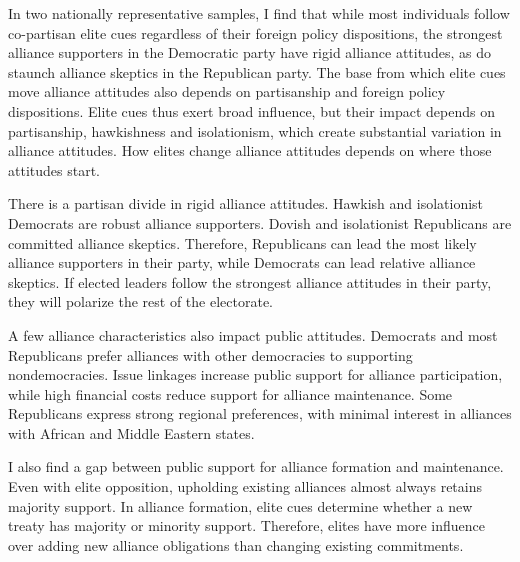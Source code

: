 \documentclass[12pt]{article}
\begin{document}
In two nationally representative samples, I find that while most individuals follow co-partisan elite cues regardless of their foreign policy dispositions, the strongest alliance supporters in the Democratic party have rigid alliance attitudes, as do staunch alliance skeptics in the Republican party. 
The base from which elite cues move alliance attitudes also depends on partisanship and foreign policy dispositions.
Elite cues thus exert broad influence, but their impact depends on partisanship, hawkishness and isolationism, which create substantial variation in alliance attitudes.
How elites change alliance attitudes depends on where those attitudes start.  


There is a partisan divide in rigid alliance attitudes.
Hawkish and isolationist Democrats are robust alliance supporters.
Dovish and isolationist Republicans are committed alliance skeptics. 
Therefore, Republicans can lead the most likely alliance supporters in their party, while Democrats can lead relative alliance skeptics. 
If elected leaders follow the strongest alliance attitudes in their party, they will polarize the rest of the electorate. 


A few alliance characteristics also impact public attitudes. 
Democrats and most Republicans prefer alliances with other democracies to supporting nondemocracies. 
Issue linkages increase public support for alliance participation, while high financial costs reduce support for alliance maintenance. 
Some Republicans express strong regional preferences, with minimal interest in alliances with African and Middle Eastern states. 


I also find a gap between public support for alliance formation and maintenance.
Even with elite opposition, upholding existing alliances almost always retains majority support. 
In alliance formation, elite cues determine whether a new treaty has majority or minority support. 
Therefore, elites have more influence over adding new alliance obligations than changing existing commitments. 
\end{document}
